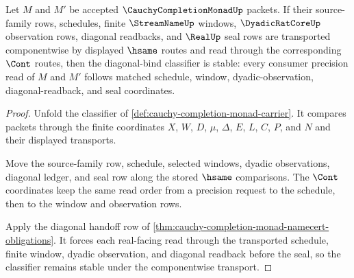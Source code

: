 \begin{theorem}
\label{thm:cauchy-completion-monad-diagonal-bind-stability}
Let $M$ and $M'$ be accepted $\CauchyCompletionMonadUp$ packets. If their source-family rows, schedules, finite $\StreamNameUp$ windows, $\DyadicRatCoreUp$ observation rows, diagonal readbacks, and $\RealUp$ seal rows are transported componentwise by displayed $\hsame$ routes and read through the corresponding $\Cont$ routes, then the diagonal-bind classifier is stable: every consumer precision read of $M$ and $M'$ follows matched schedule, window, dyadic-observation, diagonal-readback, and seal coordinates.
\end{theorem}
\begin{proof}
Unfold the classifier of \autoref{def:cauchy-completion-monad-carrier}. It compares packets through the finite coordinates $X$, $W$, $D$, $\mu$, $\Delta$, $E$, $L$, $C$, $P$, and $N$ and their displayed transports.

Move the source-family row, schedule, selected windows, dyadic observations, diagonal ledger, and seal row along the stored $\hsame$ comparisons. The $\Cont$ coordinates keep the same read order from a precision request to the schedule, then to the window and observation rows.

Apply the diagonal handoff row of \autoref{thm:cauchy-completion-monad-namecert-obligations}. It forces each real-facing read through the transported schedule, finite window, dyadic observation, and diagonal readback before the seal, so the classifier remains stable under the componentwise transport.
\end{proof}

